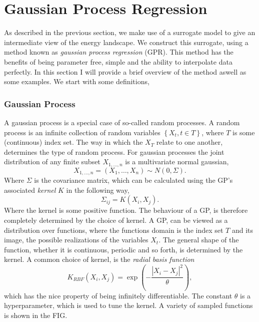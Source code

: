 % 
% 
% 




% 
\chapter{Gaussian Process Regression}
As described in the previous section, we make use of a surrogate model to give an intermediate view of the energy landscape. We construct this surrogate, using a method known as \textit{gaussian process regression} (GPR). This method has the benefits of being parameter free, simple and the ability to interpolate data perfectly. In this section I will provide a brief overview of the method aswell as some examples. We start with some definitions,
\subsection{Gaussian Process}
A gaussian process is a special case of so-called random processes. A random process is an infinite collection of random variables $\left\{ X_t, t \in T \right\} $, where $T$ is some (continuous) index set. The way in which the $X_T$ relate to one another, determines the type of random process. For gaussian processes the joint distribution of any finite subset $X_{1, \ldots, n}$ is a multivariate normal gaussian,
\[
X_{1, \ldots, n} = \left( X_1, \ldots, X_n \right) \sim N\left( 0, \Sigma \right) 
.\] 
Where $\Sigma$ is the covariance matrix, which can be calculated using the GP's associated \textit{kernel} $K$ in the following way,
\[
\Sigma_{ij} = K\left( X_i, X_j \right) 
.\] 
Where the kernel is some positive function. The behaviour of a GP, is therefore completely determined by the choice of kernel. A GP, can be viewed as a distribution over functions, where the functions domain is the index set $T$ and its image, the possible realizations of the variables $X_t$. The general shape of the function, whether it is continuous, periodic and so forth, is determined by the kernel. A common choice of kernel, is the \textit{radial basis function}
\[
    K_{RBF}\left( X_i, X_j \right) = \exp\left(-\frac{\left| X_i - X_j \right| ^2}{\theta }\right) 
,\] 
which has the nice property of being infinitely differentiable. The constant $\theta $ is a hyperparameter, which is used to tune the kernel. A variety of sampled functions is shown in the FIG.
